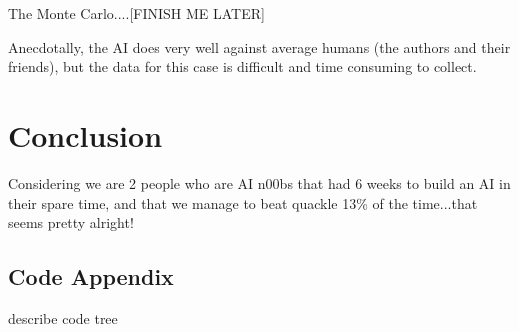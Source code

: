 \documentclass[12pt]{article}
\begin{document}
The Monte Carlo....[FINISH ME LATER]

Anecdotally, the AI does very well against average humans (the authors and their friends), but the data for this case is difficult and time consuming to collect.

\section*{Conclusion}
Considering we are 2 people who are AI n00bs that had 6 weeks to build an AI in their spare time, and that we manage to beat quackle 13\% of the time...that seems pretty alright!

\clearpage
\begin{center}
 \section*{Code Appendix}
\end{center}
describe code tree
\end{document}
